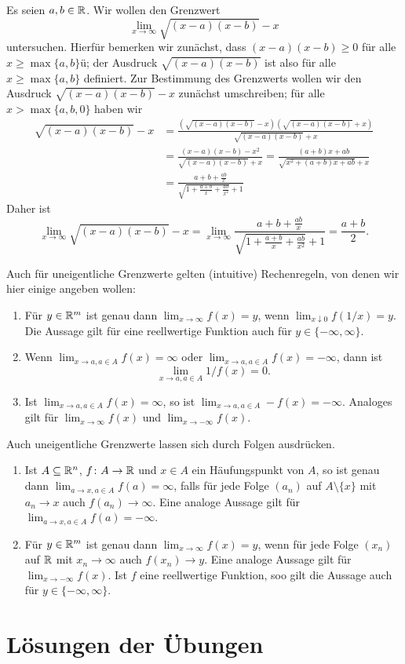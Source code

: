 \documentclass[a4paper,10pt]{article}
\begin{document}
\begin{bsp}
 Es seien $a,b \in \mathbb{R}$. Wir wollen den Grenzwert 
 \[
  \lim_{x \to \infty} \sqrt{(x-a)(x-b)}-x
 \]
 untersuchen. Hierfür bemerken wir zunächst, dass $(x-a)(x-b) \geq 0$ für alle \mbox{$x \geq \max\{a,b\}$}ü; der Ausdruck $\sqrt{(x-a)(x-b)}$ ist also für alle $x \geq \max\{a,b\}$ definiert. Zur Bestimmung des Grenzwerts wollen wir den Ausdruck $\sqrt{(x-a)(x-b)}-x$ zunächst umschreiben; für alle $x > \max\{a,b,0\}$ haben wir
 \begin{align*}
  \sqrt{(x-a)(x-b)}-x
  &= \frac{(\sqrt{(x-a)(x-b)}-x)(\sqrt{(x-a)(x-b)}+x)}{\sqrt{(x-a)(x-b)}+x} \\
  &= \frac{(x-a)(x-b)-x^2}{\sqrt{(x-a)(x-b)}+x}
  = \frac{(a+b)x + ab}{\sqrt{x^2+(a+b)x+ab}+x} \\
  &= \frac{a+b+\frac{ab}{x}}{\sqrt{1+\frac{a+b}{x}+\frac{ab}{x^2}}+1}
 \end{align*}
 Daher ist
 \[
  \lim_{x \to \infty} \sqrt{(x-a)(x-b)}-x
  = \lim_{x \to \infty} \frac{a+b+\frac{ab}{x}}{\sqrt{1+\frac{a+b}{x}+\frac{ab}{x^2}}+1}
  = \frac{a+b}{2}.
 \]
\end{bsp}


Auch für uneigentliche Grenzwerte gelten (intuitive) Rechenregeln, von denen wir hier einige angeben wollen:
\begin{enumerate}
 \item
  Für $y \in \mathbb{R}^m$ ist genau dann $\lim_{x \to \infty} f(x) = y$, wenn $\lim_{x \downarrow 0} f(1/x) = y$. Die Aussage gilt für eine reellwertige Funktion auch für $y \in \{-\infty, \infty\}$.
 \item
  Wenn $\lim_{x \to a, a \in A} f(x) = \infty$ oder $\lim_{x \to a, a \in A} f(x) = -\infty$, dann ist
  \[
   \lim_{x \to a, a \in A} 1/f(x) = 0.
  \]
 \item
  Ist $\lim_{x \to a, a \in A} f(x) = \infty$, so ist $\lim_{x \to a, a \in A} -f(x) = -\infty$. Analoges gilt für $\lim_{x \to \infty} f(x)$ und $\lim_{x \to -\infty} f(x)$.
\end{enumerate}
Auch uneigentliche Grenzwerte lassen sich durch Folgen ausdrücken.
\begin{enumerate}
 \item
  Ist $A \subseteq \mathbb{R}^n$, $f \colon A \to \mathbb{R}$ und $x \in A$ ein Häufungspunkt von $A$, so ist genau dann $\lim_{a \to x, a \in A} f(a) = \infty$, falls für jede Folge $(a_n)$ auf $A \setminus \{x\}$ mit $a_n \to x$ auch $f(a_n) \to \infty$. Eine analoge Aussage gilt für $\lim_{a \to x, a \in A} f(a) = -\infty$.
 \item
  Für $y \in \mathbb{R}^m$ ist genau dann $\lim_{x \to \infty} f(x) = y$, wenn für jede Folge $(x_n)$ auf $\mathbb{R}$ mit $x_n \to \infty$ auch $f(x_n) \to y$. Eine analoge Aussage gilt für $\lim_{x \to -\infty} f(x)$. Ist $f$ eine reellwertige Funktion, soo gilt die Aussage auch für $y \in \{-\infty, \infty\}$.
\end{enumerate}









\newpage


\section{Lösungen der Übungen}


\printsolutions
\end{document}
